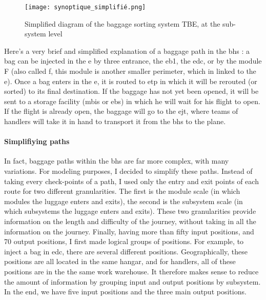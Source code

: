 \documentclass[12pt]{article}
\begin{document}
\begin{figure}[h]
    \texttt{[image: synoptique\_simplifié.png]}\\
    \caption{Simplified diagram of the baggage sorting system TBE, at the sub-system level}
    \label{fig:Simplified diagram of the baggage sorting system "TBE", at the sub-system level}
\end{figure}
\FloatBarrier
Here's a very brief and simplified explanation of a baggage path in the  \acrshort{bhs} : a bag can be injected in the \acrshort{e} by three entrance, the \acrlong{eb1}, the \acrlong{edc}, or by the module F (also called \acrshort{f}, this module is another smaller perimeter, which in linked to the \acrshort{e}). Once a bag enters in the \acrshort{e}, it is routed to \acrshort{etp} in which it will be rerouted (or sorted) to its final destination. If the baggage has not yet been opened, it will be sent to a storage facility (\acrshort{mbis} or \acrshort{ebs}) in which he will wait for his flight to open. If the flight is already open, the baggage will go to the \acrshort{ejt}, where teams of handlers will take it in hand to transport it from the \acrshort{bhs} to the plane.

\paragraph{Simplifiying paths} In fact, baggage paths within the \acrshort{bhs} are far more complex, with many variations. For modeling purposes, I decided to simplify these paths. Instead of taking every check-points of a path, I used only the entry and exit points of each route for two different granularities. The first is the module scale (in which modules the luggage enters and exits), the second is the subsystem scale (in which subsystems the luggage enters and exits). These two granularities provide information on the length and difficulty of the journey, without taking in all the information on the journey. Finally, having more than fifty input positions, and 70 output positions, I first made logical groups of positions. For example, to inject a bag in \acrshort{edc}, there are several different positions. Geographically, these positions are all located in the same hangar, and for handlers, all of these positions are in the the same work warehouse. It therefore makes sense to reduce the amount of information by grouping input and output positions by subsystem. In the end, we have five input positions and the three main output positions. 
\end{document}
